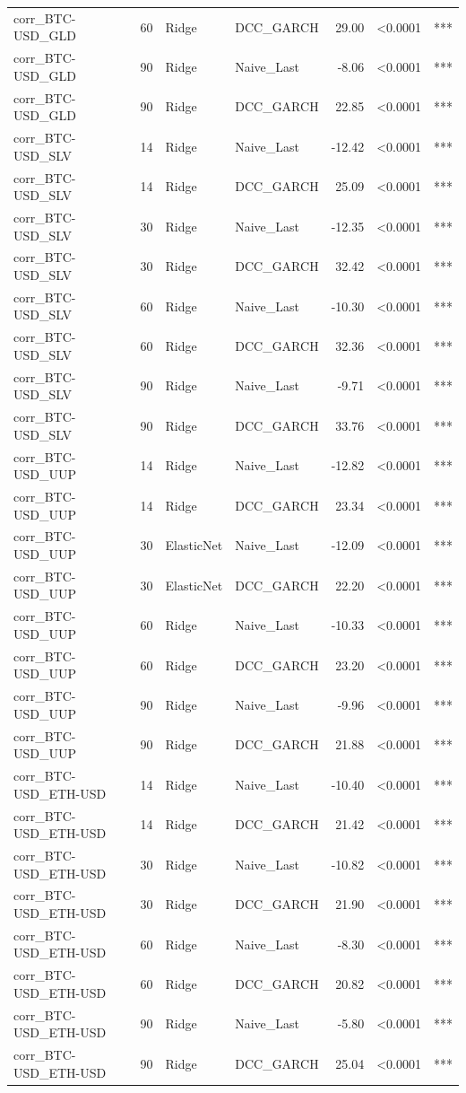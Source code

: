 \begin{table}[H]
\begin{tabular}{llllrrl}
corr_BTC-USD_GLD & 60 & Ridge & DCC_GARCH & 29.00 & <0.0001 & *** \\
corr_BTC-USD_GLD & 90 & Ridge & Naive_Last & -8.06 & <0.0001 & *** \\
corr_BTC-USD_GLD & 90 & Ridge & DCC_GARCH & 22.85 & <0.0001 & *** \\
corr_BTC-USD_SLV & 14 & Ridge & Naive_Last & -12.42 & <0.0001 & *** \\
corr_BTC-USD_SLV & 14 & Ridge & DCC_GARCH & 25.09 & <0.0001 & *** \\
corr_BTC-USD_SLV & 30 & Ridge & Naive_Last & -12.35 & <0.0001 & *** \\
corr_BTC-USD_SLV & 30 & Ridge & DCC_GARCH & 32.42 & <0.0001 & *** \\
corr_BTC-USD_SLV & 60 & Ridge & Naive_Last & -10.30 & <0.0001 & *** \\
corr_BTC-USD_SLV & 60 & Ridge & DCC_GARCH & 32.36 & <0.0001 & *** \\
corr_BTC-USD_SLV & 90 & Ridge & Naive_Last & -9.71 & <0.0001 & *** \\
corr_BTC-USD_SLV & 90 & Ridge & DCC_GARCH & 33.76 & <0.0001 & *** \\
corr_BTC-USD_UUP & 14 & Ridge & Naive_Last & -12.82 & <0.0001 & *** \\
corr_BTC-USD_UUP & 14 & Ridge & DCC_GARCH & 23.34 & <0.0001 & *** \\
corr_BTC-USD_UUP & 30 & ElasticNet & Naive_Last & -12.09 & <0.0001 & *** \\
corr_BTC-USD_UUP & 30 & ElasticNet & DCC_GARCH & 22.20 & <0.0001 & *** \\
corr_BTC-USD_UUP & 60 & Ridge & Naive_Last & -10.33 & <0.0001 & *** \\
corr_BTC-USD_UUP & 60 & Ridge & DCC_GARCH & 23.20 & <0.0001 & *** \\
corr_BTC-USD_UUP & 90 & Ridge & Naive_Last & -9.96 & <0.0001 & *** \\
corr_BTC-USD_UUP & 90 & Ridge & DCC_GARCH & 21.88 & <0.0001 & *** \\
corr_BTC-USD_ETH-USD & 14 & Ridge & Naive_Last & -10.40 & <0.0001 & *** \\
corr_BTC-USD_ETH-USD & 14 & Ridge & DCC_GARCH & 21.42 & <0.0001 & *** \\
corr_BTC-USD_ETH-USD & 30 & Ridge & Naive_Last & -10.82 & <0.0001 & *** \\
corr_BTC-USD_ETH-USD & 30 & Ridge & DCC_GARCH & 21.90 & <0.0001 & *** \\
corr_BTC-USD_ETH-USD & 60 & Ridge & Naive_Last & -8.30 & <0.0001 & *** \\
corr_BTC-USD_ETH-USD & 60 & Ridge & DCC_GARCH & 20.82 & <0.0001 & *** \\
corr_BTC-USD_ETH-USD & 90 & Ridge & Naive_Last & -5.80 & <0.0001 & *** \\
corr_BTC-USD_ETH-USD & 90 & Ridge & DCC_GARCH & 25.04 & <0.0001 & *** \\
\bottomrule
\end{tabular}
\end{table}